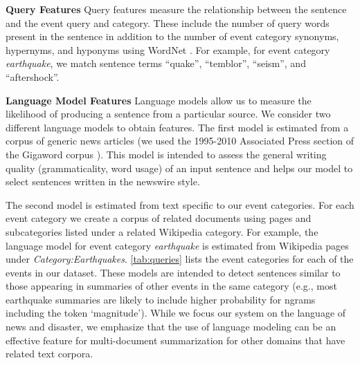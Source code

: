 \textbf{Query Features}
Query features measure the relationship between the sentence and the event
query and category.  These include the number of query words present in the
sentence in addition to the number of event category synonyms, hypernyms, and
hyponyms using WordNet \citep{miller1995wordnet}.  For example, for event
category \emph{earthquake},  we match sentence terms ``quake'', ``temblor'',
``seism'', and ``aftershock''.

\textbf{Language Model Features}\label{subsubsec:lm}
Language models allow us to measure the likelihood of producing a sentence 
from a particular source.  We consider two different language models to 
obtain features.  
The first model is estimated from a corpus of generic news articles (we used 
the 1995-2010 Associated Press section of the Gigaword corpus 
\citep{graff2003english}).  
This model is intended to assess the general writing quality (grammaticality, 
word usage) of an input sentence and helps our model to select sentences
written in the newswire style.  



The second model is estimated from text specific to our event categories.  For
each event category we create a corpus of related documents using pages and
subcategories listed under a related Wikipedia category. For example, the
language model for event category \textit{earthquake} is estimated from
Wikipedia pages under \emph{Category:Earthquakes}.
\autoref{tab:queries} lists the event categories for each of the events in our
dataset. These models are intended to detect sentences similar to those
appearing in summaries of other events in the same category (e.g., most
earthquake summaries are likely to include higher probability for ngrams
including the token `magnitude').  While we focus our system on the language
of news and disaster, we emphasize that the use of language modeling can be an
effective feature for multi-document summarization for other domains that have
related text corpora.

